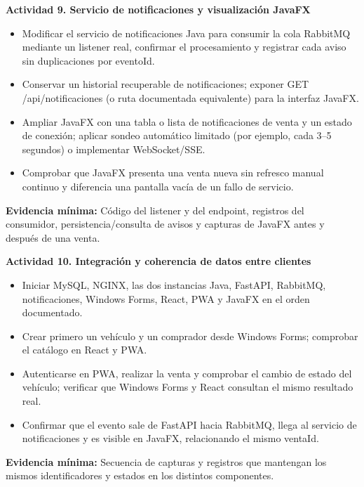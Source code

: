 \documentclass[11pt,a4paper]{article}
\renewcommand{\_}{\oldunderscore\allowbreak}
\begin{document}
\vspace{0.2cm}

\noindent\textbf{Actividad 9. Servicio de notificaciones y visualización JavaFX}
\begin{itemize}[leftmargin=*,itemsep=2pt,topsep=2pt]
  \item Modificar el servicio de notificaciones Java para consumir la cola RabbitMQ mediante un listener real, confirmar el procesamiento y registrar cada aviso sin duplicaciones por eventoId.
  \item Conservar un historial recuperable de notificaciones; exponer GET /api/notificaciones (o ruta documentada equivalente) para la interfaz JavaFX.
  \item Ampliar JavaFX con una tabla o lista de notificaciones de venta y un estado de conexión; aplicar sondeo automático limitado (por ejemplo, cada 3–5 segundos) o implementar WebSocket/SSE.
  \item Comprobar que JavaFX presenta una venta nueva sin refresco manual continuo y diferencia una pantalla vacía de un fallo de servicio.
\end{itemize}
\textbf{Evidencia mínima:} Código del listener y del endpoint, registros del consumidor, persistencia/consulta de avisos y capturas de JavaFX antes y después de una venta.

\vspace{0.2cm}

\noindent\textbf{Actividad 10. Integración y coherencia de datos entre clientes}
\begin{itemize}[leftmargin=*,itemsep=2pt,topsep=2pt]
  \item Iniciar MySQL, NGINX, las dos instancias Java, FastAPI, RabbitMQ, notificaciones, Windows Forms, React, PWA y JavaFX en el orden documentado.
  \item Crear primero un vehículo y un comprador desde Windows Forms; comprobar el catálogo en React y PWA.
  \item Autenticarse en PWA, realizar la venta y comprobar el cambio de estado del vehículo; verificar que Windows Forms y React consultan el mismo resultado real.
  \item Confirmar que el evento sale de FastAPI hacia RabbitMQ, llega al servicio de notificaciones y es visible en JavaFX, relacionando el mismo ventaId.
\end{itemize}
\textbf{Evidencia mínima:} Secuencia de capturas y registros que mantengan los mismos identificadores y estados en los distintos componentes.
\end{document}
